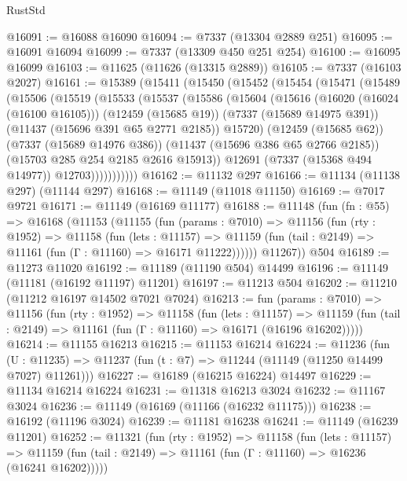 \begin{lexlean}{RustStd}
\begin{coremodule}
@16091 := @16088 @16090
@16094 := @7337 (@13304 @2889 @251)
@16095 := @16091 @16094
@16099 := @7337 (@13309 @450 @251 @254)
@16100 := @16095 @16099
@16103 := @11625 (@11626 (@13315 @2889))
@16105 := @7337 (@16103 @2027)
@16161 := @15389
    (@15411
      (@15450
        (@15452
          (@15454
            (@15471
              (@15489
                (@15506
                  (@15519
                    (@15533
                      (@15537
                        (@15586
                          (@15604
                            (@15616
                              (@16020 (@16024 (@16100 @16105)))
                              (@12459 (@15685 @19))
                              (@7337 (@15689 @14975 @391))
                              (@11437 (@15696 @391 @65 @2771 @2185))
                              @15720)
                            (@12459 (@15685 @62))
                            (@7337 (@15689 @14976 @386))
                            (@11437 (@15696 @386 @65 @2766 @2185))
                            (@15703 @285 @254 @2185 @2616 @15913))
                          @12691
                          (@7337 (@15368 @494 @14977))
                          @12703)))))))))))
@16162 := @11132 @297
@16166 := @11134 (@11138 @297) (@11144 @297)
@16168 := @11149 (@11018 @11150)
@16169 := @7017 @9721
@16171 := @11149 (@16169 @11177)
@16188 := @11148
    (fun (fn : @55) =>
    @16168
      (@11153
        (@11155
          (fun (params : @7010) =>
          @11156
            (fun (rty : @1952) =>
            @11158
              (fun (lets : @11157) =>
              @11159 (fun (tail : @2149) => @11161 (fun (Γ : @11160) => @16171 @11222))))))
        @11267))
    @504
@16189 := @11273 @11020
@16192 := @11189 (@11190 @504) @14499
@16196 := @11149 (@11181 (@16192 @11197) @11201)
@16197 := @11213 @504
@16202 := @11210 (@11212 @16197 @14502 @7021 @7024)
@16213 := fun (params : @7010) =>
  @11156
    (fun (rty : @1952) =>
    @11158
      (fun (lets : @11157) =>
      @11159 (fun (tail : @2149) => @11161 (fun (Γ : @11160) => @16171 (@16196 @16202)))))
@16214 := @11155 @16213
@16215 := @11153 @16214
@16224 := @11236
    (fun (U : @11235) => @11237 (fun (t : @7) => @11244 (@11149 (@11250 @14499 @7027) @11261)))
@16227 := @16189 (@16215 @16224) @14497
@16229 := @11134 @16214 @16224
@16231 := @11318 @16213 @3024
@16232 := @11167 @3024
@16236 := @11149 (@16169 (@11166 (@16232 @11175)))
@16238 := @16192 (@11196 @3024)
@16239 := @11181 @16238
@16241 := @11149 (@16239 @11201)
@16252 := @11321
    (fun (rty : @1952) =>
    @11158
      (fun (lets : @11157) =>
      @11159 (fun (tail : @2149) => @11161 (fun (Γ : @11160) => @16236 (@16241 @16202)))))

\end{coremodule}
\end{lexlean}
